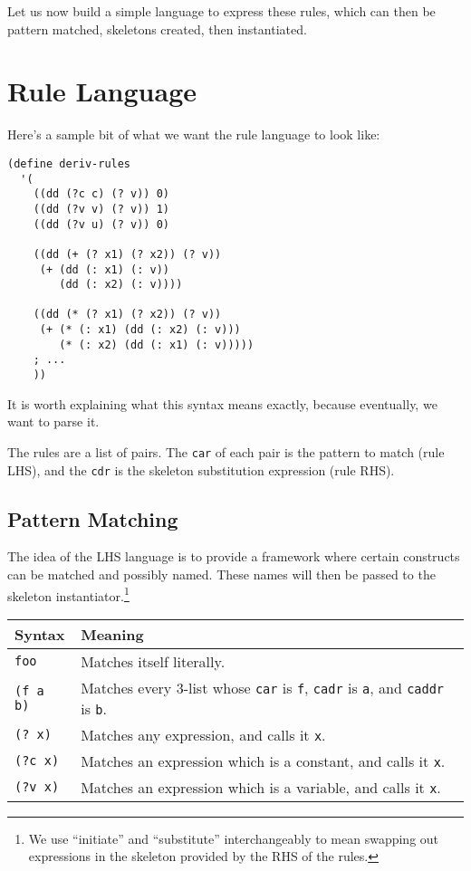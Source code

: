\documentclass[9pt]{report}
\begin{document}
Let us now build a simple language to express these rules, which can
then be pattern matched, skeletons created, then instantiated.

\section{Rule Language}
\label{sec:org78835cb}

Here's a sample bit of what we want the rule language to look like:

\begin{verbatim}
(define deriv-rules
  '(
    ((dd (?c c) (? v)) 0)
    ((dd (?v v) (? v)) 1)
    ((dd (?v u) (? v)) 0)

    ((dd (+ (? x1) (? x2)) (? v))
     (+ (dd (: x1) (: v))
        (dd (: x2) (: v))))

    ((dd (* (? x1) (? x2)) (? v))
     (+ (* (: x1) (dd (: x2) (: v)))
        (* (: x2) (dd (: x1) (: v)))))
    ; ...
    ))
\end{verbatim}

It is worth explaining what this syntax means exactly, because
eventually, we want to parse it.

The rules are a list of pairs. The \texttt{car} of each pair is the
pattern to match (rule LHS), and the \texttt{cdr} is the skeleton
substitution expression (rule RHS).

\subsection{Pattern Matching}
\label{sec:org3b6df22}

The idea of the LHS language is to provide a framework where
certain constructs can be matched and possibly named. These names
will then be passed to the skeleton instantiator.\footnote{We use ``initiate'' and ``substitute'' interchangeably to mean
swapping out expressions in the skeleton provided by the RHS of the
rules.}

\begin{center}
\begin{tabular}{ll}
\toprule
Syntax & Meaning\\
\midrule
\texttt{foo} & Matches itself literally.\\
\texttt{(f a b)} & Matches every 3-list whose \texttt{car} is \texttt{f}, \texttt{cadr} is \texttt{a}, and \texttt{caddr} is \texttt{b}.\\
\texttt{(? x)} & Matches any expression, and calls it \texttt{x}.\\
\texttt{(?c x)} & Matches an expression which is a constant, and calls it \texttt{x}.\\
\texttt{(?v x)} & Matches an expression which is a variable, and calls it \texttt{x}.\\
\bottomrule
\end{tabular}
\end{center}
\end{document}

